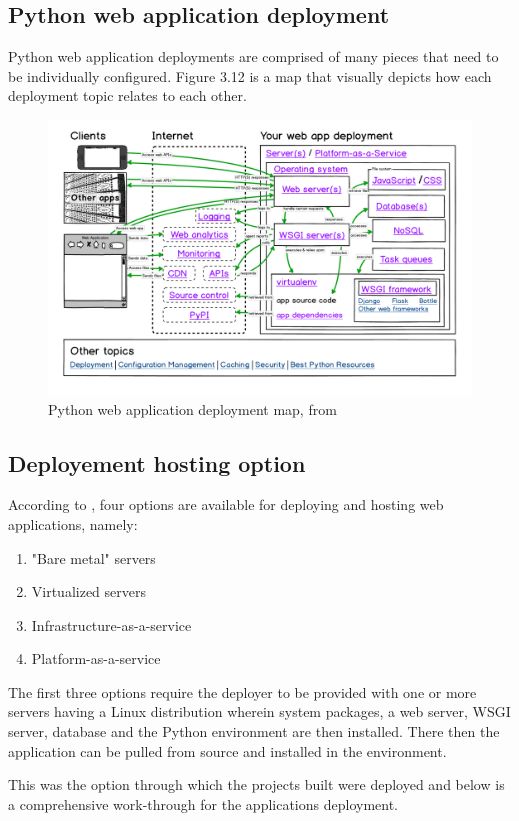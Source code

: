 \subsection{Python web application deployment}
Python web application deployments are comprised of many pieces that need to be individually configured. Figure 3.12 is a map that visually depicts how each deployment topic relates to each other.
\begin{figure}[!htbp]
	\centering
	\includegraphics[width=1\textwidth]{./deploy.png}
	\caption{Python web application deployment map, from \citet{Makai:2020}}
\end{figure}
\subsection{Deployement hosting option}
According to \citet{Makai:2020}, four options are available for deploying and hosting web applications, namely:
\begin{enumerate}
	\item "Bare metal" servers
	\item Virtualized servers
	\item Infrastructure-as-a-service
	\item Platform-as-a-service
\end{enumerate}
The first three options require the deployer to be provided with one or more servers having a Linux distribution wherein system packages, a web server, \ac{WSGI} server, database and the Python environment are then installed. There then the application can be pulled from source and installed in the environment.

This was the option through which the projects built were deployed and below is a comprehensive work-through for the applications deployment.
